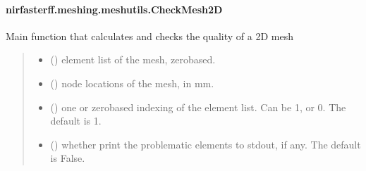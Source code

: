 \documentclass[letterpaper,10pt,english]{sphinxmanual}
\begin{document}
\sphinxstepscope


\paragraph{nirfasterff.meshing.meshutils.CheckMesh2D}
\label{\detokenize{_autosummary/nirfasterff.meshing.meshutils.CheckMesh2D:nirfasterff-meshing-meshutils-checkmesh2d}}\label{\detokenize{_autosummary/nirfasterff.meshing.meshutils.CheckMesh2D::doc}}

\begin{fulllineitems}
\label{\detokenize{_autosummary/nirfasterff.meshing.meshutils.CheckMesh2D:nirfasterff.meshing.meshutils.CheckMesh2D}}
\pysigstartsignatures
\pysiglinewithargsret
{}
{\sphinxparamcomma {}\sphinxparamcomma {}\sphinxparamcomma {}}
{}
\pysigstopsignatures
\sphinxAtStartPar
Main function that calculates and checks the quality of a 2D mesh
\begin{quote}\begin{description}
\begin{itemize}
\item {} 
\sphinxAtStartPar
{} () \textendash{} element list of the mesh, zero\sphinxhyphen{}based.

\item {} 
\sphinxAtStartPar
{} () \textendash{} node locations of the mesh, in mm.

\item {} 
\sphinxAtStartPar
{} (\sphinxstyleliteralemphasis{\sphinxupquote{, }}) \textendash{} one\sphinxhyphen{} or zero\sphinxhyphen{}based indexing of the element list. Can be 1, or 0. The default is 1.

\item {} 
\sphinxAtStartPar
{} (\sphinxstyleliteralemphasis{\sphinxupquote{, }}) \textendash{} whether print the problematic elements to stdout, if any. The default is False.


\end{itemize}
\end{description}
\end{quote}
\end{fulllineitems}
\end{document}
